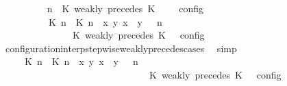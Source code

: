 \begin{isabellebody}
\ \ \ \ \ \ \isamarkupfalse%
\ {\isacartoucheopen}{\isasymlbrakk}\ {\isasymGamma}{\isacharcomma}\ n\ {\isasymturnstile}\ {\isacharparenleft}{\isacharparenleft}K\ weakly\ precedes\ K\ {\isacharhash}\ {\isasymPsi}{\isacharparenright}\ {\isasymtriangleright}\ {\isasymPhi}\ {\isasymrbrakk}\isactrlsub c\isactrlsub o\isactrlsub n\isactrlsub f\isactrlsub i\isactrlsub g\ {\isacharequal}\isanewline
\ \ \ \ \ \ \ \ {\isasymlbrakk}\ {\isacharparenleft}{\isacharparenleft}{\isasymlceil}{\isacharhash}\isactrlsup {\isasymle}\ K\ n{\isacharcomma}\ {\isacharhash}\isactrlsup {\isasymle}\ K\ n{\isasymrceil}\ {\isasymin}\ {\isacharparenleft}{\isasymlambda}{\isacharparenleft}x{\isacharcomma}\ y{\isacharparenright}{\isachardot}\ x\ {\isasymle}\ y{\isacharparenright}{\isacharparenright}\ {\isacharhash}\ {\isasymGamma}{\isacharparenright}{\isacharcomma}\ n\isanewline
\ \ \ \ \ \ \ \ \ \ \ \ {\isasymturnstile}\ {\isasymPsi}\ {\isasymtriangleright}\ {\isacharparenleft}{\isacharparenleft}K\ weakly\ precedes\ K\ {\isacharhash}\ {\isasymPhi}{\isacharparenright}\ {\isasymrbrakk}\isactrlsub c\isactrlsub o\isactrlsub n\isactrlsub f\isactrlsub i\isactrlsub g{\isacartoucheclose}\isanewline
\ \ \ \ \ \ \ \ \isamarkupfalse%
\ configuration{\isacharunderscore}interp{\isacharunderscore}stepwise{\isacharunderscore}weakly{\isacharunderscore}precedes{\isacharunderscore}cases\ \isamarkupfalse%
\ simp\isanewline
\ \ \ \ \ \ \isamarkupfalse%
\ \isamarkupfalse%
\ {\isacartoucheopen}{\isasymrho}\ {\isasymin}\ {\isasymlbrakk}\ {\isacharparenleft}{\isacharparenleft}{\isasymlceil}{\isacharhash}\isactrlsup {\isasymle}\ K\ n{\isacharcomma}\ {\isacharhash}\isactrlsup {\isasymle}\ K\ n{\isasymrceil}\ {\isasymin}\ {\isacharparenleft}{\isasymlambda}{\isacharparenleft}x{\isacharcomma}\ y{\isacharparenright}{\isachardot}\ x\ {\isasymle}\ y{\isacharparenright}{\isacharparenright}\ {\isacharhash}\ {\isasymGamma}{\isacharparenright}{\isacharcomma}\ n\isanewline
\ \ \ \ \ \ \ \ \ \ \ \ \ \ \ \ \ \ \ \ \ \ \ \ \ \ \ \ {\isasymturnstile}\ {\isasymPsi}\ {\isasymtriangleright}\ {\isacharparenleft}{\isacharparenleft}K\ weakly\ precedes\ K\ {\isacharhash}\ {\isasymPhi}{\isacharparenright}\ {\isasymrbrakk}\isactrlsub c\isactrlsub o\isactrlsub n\isactrlsub f\isactrlsub i\isactrlsub g\isanewline

\end{isabellebody}
